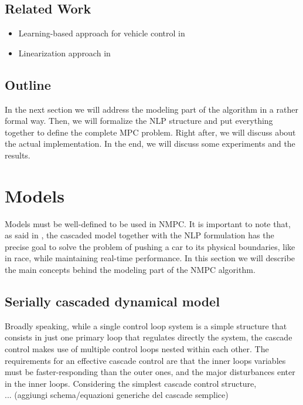 \documentclass[a4paper, onecolumn, 12pt]{article}
\begin{document}
\subsection*{Related Work}


\begin{itemize}
    \item Learning-based approach for vehicle control in \cite{rosolia}
    \item Linearization approach in \cite{bemporad}
\end{itemize}

\subsection*{Outline}

In the next section we will address the modeling part of the algorithm in a
rather formal way. Then, we will formalize the NLP structure and put everything
together to define the complete MPC problem. Right after, we will discuss about
the actual implementation. In the end, we will discuss some experiments and the
results.


\newpage
\section{Models}

Models must be well-defined to be used in NMPC. It is important to note that, as
said in \cite{paper}, the cascaded model together with the NLP formulation has
the precise goal to solve the problem of pushing a car to its physical
boundaries, like in race, while maintaining real-time performance. In this
section we will describe the main concepts behind the modeling part of the NMPC
algorithm. 

\subsection{Serially cascaded dynamical model}
Broadly speaking, while a single control loop system is a simple structure that
consists in just one primary loop that regulates directly the system, the
cascade control makes use of multiple control loops nested within each other.
The requirements for an effective cascade control are that the inner loops
variables must be faster-responding than the outer ones, and the major
disturbances enter in the inner loops. Considering the simplest cascade control
structure,\\
... (aggiungi schema/equazioni generiche del cascade semplice)
\end{document}

